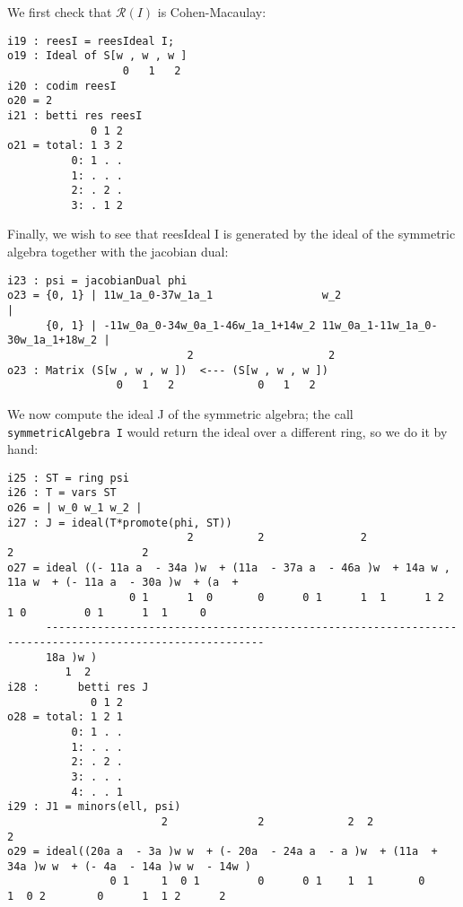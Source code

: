 \documentclass[twoside,12pt, leqno]{amsart}
\def\RR{{\mathcal R}}
\begin{document}
           We first check that $\RR(I)$ is Cohen-Macaulay:
\begin{footnotesize}
 \begin{verbatim}
i19 : reesI = reesIdeal I;
o19 : Ideal of S[w , w , w ]
                  0   1   2
i20 : codim reesI
o20 = 2
i21 : betti res reesI
             0 1 2
o21 = total: 1 3 2
          0: 1 . .
          1: . . .
          2: . 2 .
          3: . 1 2
\end{verbatim}
\end{footnotesize}
Finally, we wish to see that reesIdeal I is generated by the ideal 
           of the symmetric algebra together with the jacobian dual:
\begin{footnotesize}
 \begin{verbatim}
i23 : psi = jacobianDual phi
o23 = {0, 1} | 11w_1a_0-37w_1a_1                 w_2                              |
      {0, 1} | -11w_0a_0-34w_0a_1-46w_1a_1+14w_2 11w_0a_1-11w_1a_0-30w_1a_1+18w_2 |
                            2                     2
o23 : Matrix (S[w , w , w ])  <--- (S[w , w , w ])
                 0   1   2             0   1   2
\end{verbatim}
\end{footnotesize}
We now compute the ideal J of the symmetric algebra; the call {\tt symmetricAlgebra I}
           would return the ideal over a different ring, so we do it by hand:
\begin{footnotesize}
 \begin{verbatim}
i25 : ST = ring psi
i26 : T = vars ST
o26 = | w_0 w_1 w_2 |
i27 : J = ideal(T*promote(phi, ST))
                            2          2               2                 2                    2
o27 = ideal ((- 11a a  - 34a )w  + (11a  - 37a a  - 46a )w  + 14a w , 11a w  + (- 11a a  - 30a )w  + (a  +
                   0 1      1  0       0      0 1      1  1      1 2     1 0         0 1      1  1     0  
      --------------------------------------------------------------------------------------------------------
      18a )w )
         1  2
i28 :      betti res J
             0 1 2
o28 = total: 1 2 1
          0: 1 . .
          1: . . .
          2: . 2 .
          3: . . .
          4: . . 1
i29 : J1 = minors(ell, psi)
                        2              2             2  2                                               2
o29 = ideal((20a a  - 3a )w w  + (- 20a  - 24a a  - a )w  + (11a  + 34a )w w  + (- 4a  - 14a )w w  - 14w )
                0 1     1  0 1         0      0 1    1  1       0      1  0 2        0      1  1 2      2
  \end{verbatim}
  \end{footnotesize}
\end{document}
